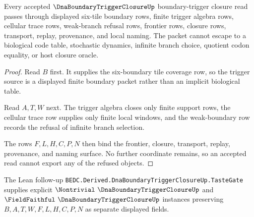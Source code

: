 \begin{theorem}
\label{thm:dna-boundary-trigger-closure-nonescape}
Every accepted $\DnaBoundaryTriggerClosureUp$ boundary-trigger closure read passes through displayed six-tile boundary rows, finite trigger algebra rows, cellular trace rows, weak-branch refusal rows, frontier rows, closure rows, transport, replay, provenance, and local naming. The packet cannot escape to a biological code table, stochastic dynamics, infinite branch choice, quotient codon equality, or host closure oracle.
\end{theorem}
\begin{proof}
Read $B$ first. It supplies the six-boundary tile coverage row, so the trigger source is a displayed finite boundary packet rather than an implicit biological table.

Read $A,T,W$ next. The trigger algebra closes only finite support rows, the cellular trace row supplies only finite local windows, and the weak-boundary row records the refusal of infinite branch selection.

The rows $F,L,H,C,P,N$ then bind the frontier, closure, transport, replay, provenance, and naming surface. No further coordinate remains, so an accepted read cannot export any of the refused objects.
\end{proof}



The Lean follow-up \texttt{BEDC.Derived.DnaBoundaryTriggerClosureUp.TasteGate} supplies explicit $\Nontrivial\ \DnaBoundaryTriggerClosureUp$ and $\FieldFaithful\ \DnaBoundaryTriggerClosureUp$ instances preserving $B,A,T,W,F,L,H,C,P,N$ as separate displayed fields.


